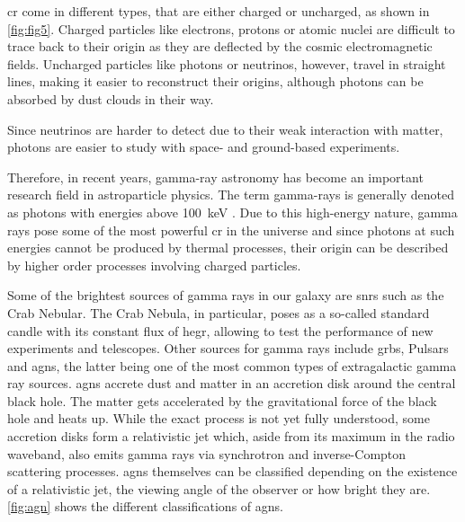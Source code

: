 \gls{cr} come in different types, that are either charged or uncharged, as shown in \autoref{fig:fig5}.
Charged particles like electrons, protons or atomic nuclei are difficult to trace back to their origin
as they are deflected by the cosmic electromagnetic fields. Uncharged particles like photons or
neutrinos, however, travel in straight lines, making it easier to reconstruct their origins,
although photons can be absorbed by dust clouds in their way.

Since neutrinos are harder to detect due to their weak interaction with matter, photons are easier to study
with space- and ground-based experiments.

Therefore, in recent years, gamma-ray astronomy has become an important research field in astroparticle physics.
The term gamma-rays is generally denoted as photons with energies above \SI{100}{\kilo\eV}
\cite{funk}. Due to this high-energy nature, gamma rays pose some of the most powerful \gls{cr} in
the universe and since photons at such energies cannot be produced by thermal processes, their origin
can be described by higher order processes involving charged particles.

Some of the brightest sources of gamma rays in our galaxy are \glspl{snr} such as the Crab Nebular.
The Crab Nebula, in particular, poses as a so-called standard candle with its constant flux of
\gls{hegr}, allowing to test the performance of new experiments and telescopes. Other sources for
gamma rays include \glspl{grb}, Pulsars and \glspl{agn}, the latter being one of the most common types
of extragalactic gamma ray sources. \glspl{agn} accrete dust and matter in an accretion disk around the
central black hole. The matter gets accelerated by the gravitational force of the black hole and heats
up. While the exact process is not yet fully understood, some accretion disks form a relativistic jet
which, aside from its maximum in the radio waveband, also emits gamma rays via synchrotron
and inverse-Compton scattering processes. \glspl{agn} themselves can be classified depending on the existence
of a relativistic jet, the viewing angle of the observer or how bright they are. \autoref{fig:agn}
shows the different classifications of \glspl{agn}.

